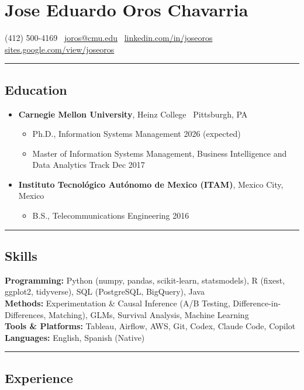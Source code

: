 \documentclass[10pt,letterpaper]{article}
\newcommand{\name}[1]{\section*{#1}}
\newcommand{\sep}{{\color{gray}\,\textbullet\,\,}}
\newcommand{\hsep}{\noindent\textcolor{gray}{\rule{\textwidth}{0.5pt}}}
\newcommand{\block}[1]{\begin{samepage}\hsep\subsection*{#1}\end{samepage}}
\begin{document}
\name{Jose Eduardo Oros Chavarria}

\begin{center}
(412) 500-4169 \sep \href{mailto:joros@cmu.edu}{joros@cmu.edu} \sep \href{https://www.linkedin.com/in/joseoros}{linkedin.com/in/joseoros} \sep \href{https://sites.google.com/view/joseoros}{sites.google.com/view/joseoros}
\end{center}

\block{Education}

\begin{itemize}[leftmargin=0pt, label={}, itemsep=4pt]
\item \textbf{Carnegie Mellon University}, Heinz College \sep Pittsburgh, PA
  \begin{itemize}[label={}]
  \item Ph.D., Information Systems Management \hfill 2026 (expected)
  \item Master of Information Systems Management, Business Intelligence and Data Analytics Track \hfill Dec 2017
  \end{itemize}
\item \textbf{Instituto Tecnol\'ogico Aut\'onomo de Mexico (ITAM)}, Mexico City, Mexico
  \begin{itemize}[label={}]
  \item B.S., Telecommunications Engineering \hfill 2016
  \end{itemize}
\end{itemize}

\block{Skills}

\noindent\textbf{Programming:} Python (numpy, pandas, scikit-learn, statsmodels), R (fixest, ggplot2, tidyverse), SQL (PostgreSQL, BigQuery), Java \\
\textbf{Methods:} Experimentation \& Causal Inference (A/B Testing, Difference-in-Differences, Matching), GLMs, Survival Analysis, Machine Learning \\
\textbf{Tools \& Platforms:} Tableau, Airflow, AWS, Git, Codex, Claude Code, Copilot \\
\textbf{Languages:} English, Spanish (Native)

\block{Experience}
\end{document}
